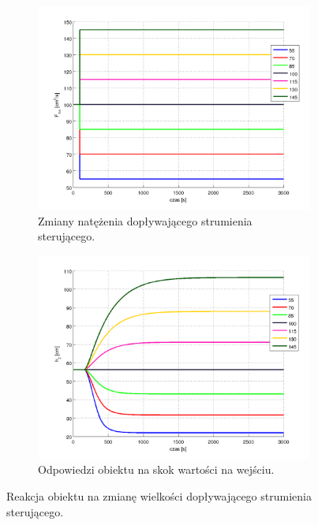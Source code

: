 \documentclass[a4paper,12pt]{article}
\begin{document}
\begin{figure}[h]
   \centering
   \begin{subfigure}[h]{0.45\textwidth}
      \includegraphics[width=\textwidth]{img/symulacja_obiektu_1a.png}
      \caption{Zmiany natężenia dopływającego strumienia sterującego.}
   \end{subfigure}
   \begin{subfigure}[h]{0.45\textwidth}
      \includegraphics[width=\textwidth]{img/symulacja_obiektu_1b.png}
      \caption{Odpowiedzi obiektu na skok wartości na wejściu.}
   \end{subfigure}
   \caption{Reakcja obiektu na zmianę wielkości dopływającego strumienia sterującego.}
   \label{img:symulacja_obiektu_1}
\end{figure}
\end{document}
